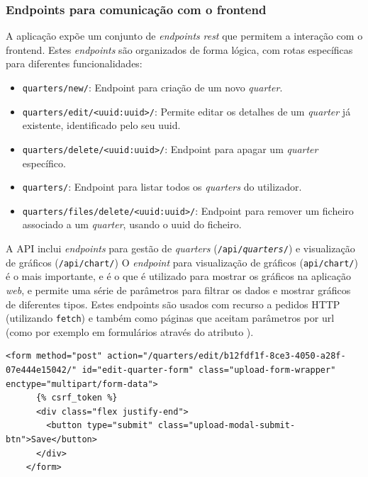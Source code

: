 \subsubsection{Endpoints para comunicação com o frontend}

A aplicação expõe um conjunto de \textit{endpoints} \textit{rest} que permitem a interação com o frontend. Estes \textit{endpoints} são organizados de forma lógica, com rotas específicas para diferentes funcionalidades:

\begin{itemize}
    \item \texttt{quarters/new/}: Endpoint para criação de um novo \textit{quarter}.
    \item \texttt{quarters/edit/<uuid:uuid>/}: Permite editar os detalhes de um \textit{quarter} já existente, identificado pelo seu \gls{uuid}.
    \item \texttt{quarters/delete/<uuid:uuid>/}: Endpoint para apagar um \textit{quarter} específico.
    \item \texttt{quarters/}: Endpoint para listar todos os \textit{quarters} do utilizador.
    \item \texttt{quarters/files/delete/<uuid:uuid>/}: Endpoint para remover um ficheiro associado a um \textit{quarter}, usando o \gls{uuid} do ficheiro.
  \end{itemize}
  
A API inclui \textit{endpoints} para gestão de \textit{quarters} (\texttt{/api/\textit{quarters}/}) e visualização de gráficos (\texttt{/api/chart/})  O \textit{endpoint} para visualização de gráficos (\texttt{api/chart/}) é o mais importante, e é o que é utilizado para mostrar os gráficos na aplicação \textit{web}, e permite uma série de parâmetros para filtrar os dados e mostrar gráficos de diferentes tipos. Estes endpoints são usados com recurso a pedidos HTTP (utilizando \texttt{fetch}) e também como páginas que aceitam parâmetros por \gls{url} (como por exemplo em formulários através do atributo ).

\begin{lstlisting}[language=\gls{html}, caption={Excerto do código \gls{html} do formulário de edição de \textit{quarter}}]
    <form method="post" action="/quarters/edit/b12fdf1f-8ce3-4050-a28f-07e444e15042/" id="edit-quarter-form" class="upload-form-wrapper" enctype="multipart/form-data">
      {% csrf_token %}
      <div class="flex justify-end">
        <button type="submit" class="upload-modal-submit-btn">Save</button>
      </div>
    </form>
    \end{lstlisting}

